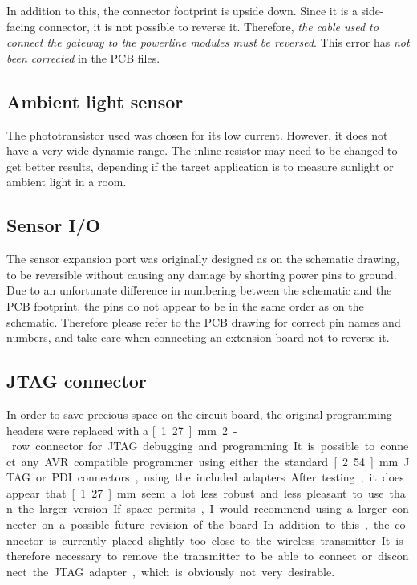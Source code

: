 In addition to this, the connector footprint is upside down. Since it is a
side-facing connector, it is not possible to reverse it. Therefore, \emph{the
cable used to connect the gateway to the powerline modules must be reversed}.
This error has \emph{not been corrected} in the PCB files.

\subsection{Ambient light sensor}
The phototransistor used was chosen for its low current. However, it does not
have a very wide dynamic range. The inline resistor may need to be changed to
get better results, depending if the target application is to measure sunlight
or ambient light in a room.

\subsection{Sensor I/O}
The sensor expansion port was originally designed as on the schematic drawing,
to be reversible without causing any damage by shorting power pins to ground.
Due to an unfortunate difference in numbering between the schematic and the PCB
footprint, the pins do not appear to be in the same order as on the schematic.
Therefore please refer to the PCB drawing for correct pin names and numbers, and
take care when connecting an extension board not to reverse it.

\subsection{JTAG connector}
In order to save precious space on the circuit board, the original programming
headers were replaced with a \unit[1.27]{mm} 2-row connector for JTAG debugging
and programming. It is possible to connect any AVR compatible programmer using
either the standard \unit[2.54]{mm} JTAG or PDI connectors, using the included
adapters.

After testing, it does appear that \unit[1.27]{mm} seem a lot less robust and
less pleasant to use than the larger version. If space permits, I would
recommend using a larger connecter on a possible future revision of the board.

In addition to this, the connector is currently placed slightly too close to the
wireless transmitter. It is therefore necessary to remove the transmitter to be
able to connect or disconnect the JTAG adapter, which is obviously not very
desirable.

